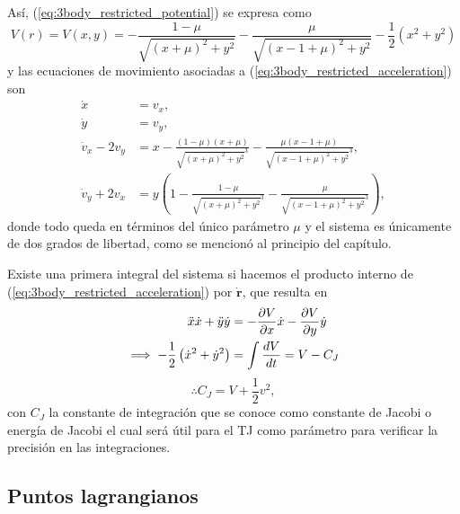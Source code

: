 Así, (\ref{eq:3body_restricted_potential}) se expresa como
\begin{equation}
 V(r) = V(x,y) = -\frac{1 - \mu}{\sqrt{(x + \mu)^2 + y^2}} -  \frac{\mu}{\sqrt{(x - 1 + \mu)^2 + y^2}} - \frac{1}{2} \left(x^2 + y^2 \right)
\end{equation}
y las ecuaciones de movimiento asociadas a (\ref{eq:3body_restricted_acceleration}) son
\begin{align}
 \dot{x} &= v_x, \\
 \dot{y} &= v_y, \\
 \dot{v}_x - 2v_y &=  x - \frac{(1 - \mu) (x+\mu)}{\sqrt{ (x+\mu)^2 + y^2 }^3} - \frac{\mu (x - 1 + \mu) }{\sqrt{(x - 1 +  \mu)^2 + y^2}^3 }, \\ 
 \dot{v}_y + 2v_x &= y \left( 1 - \frac{ 1 - \mu }{\sqrt{(x+\mu)^2 + y^2}^3} - \frac{\mu}{\sqrt{(x - 1 + \mu)^2 + y^2}^3} \right),
 \label{eq:3body_restricted_ eqs_motion}
\end{align}
donde todo queda en términos del único parámetro $\mu$ y el sistema es únicamente de dos grados de libertad, como se mencionó al principio del capítulo. 

Existe una primera integral del sistema si hacemos el producto interno de (\ref{eq:3body_restricted_acceleration}) por $\dot{\mathbf{r}}$, que resulta en 
\begin{align*}
 \ddot{x} \dot{x} + \ddot{y} \dot{y} &= - \frac{\partial V}{\partial x}\dot{x} - \frac{\partial V}{\partial y} \dot{y} \\
 \implies - \frac{1}{2} \left( \dot{x}^2 + \dot{y}^2 \right) &= \int \frac{d V}{dt} = V - C_J 
\end{align*}
\begin{equation}
 \therefore C_J = V + \frac{1}{2}v^2,
 \label{eq:3body_jacobi_constant}
\end{equation}
con $C_J$ la constante de integración que se conoce como constante de Jacobi o energía de Jacobi el cual será útil para el TJ como parámetro para verificar la precisión en las integraciones.

\subsection{Puntos lagrangianos}
\label{sec:lag_points}

